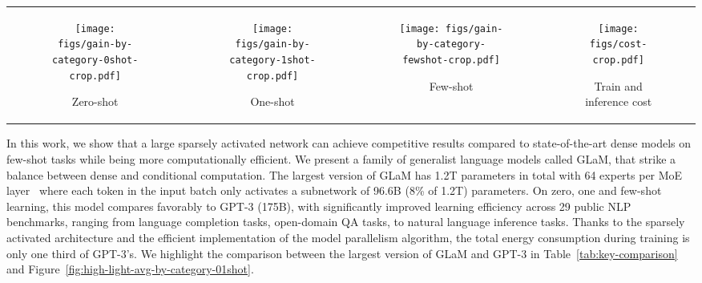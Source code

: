 \documentclass{article}
\newcommand{\glam}{GLaM\xspace}
\begin{document}
\begin{figure*}[tb]
\centering
\renewcommand\tabcolsep{1pt}
\begin{tabular}{cccc}
\begin{subfigure}[b]{0.25\textwidth}
\texttt{[image: figs/gain-by-category-0shot-crop.pdf]}
\caption{Zero-shot}
\end{subfigure}
&
\begin{subfigure}[b]{0.25\textwidth}
\texttt{[image: figs/gain-by-category-1shot-crop.pdf]}
\caption{One-shot}
\end{subfigure}
&
\begin{subfigure}[b]{0.25\textwidth}
\texttt{[image: figs/gain-by-category-fewshot-crop.pdf]}
\caption{Few-shot}
\end{subfigure}
&
\begin{subfigure}[b]{0.25\textwidth}
\texttt{[image: figs/cost-crop.pdf]}
\caption{Train and inference cost}
\end{subfigure}
\end{tabular}
\caption{An overview of the percentage change in predictive performance (higher is better) of \glam (64B/64E) versus GPT-3 (175B) in the (a) zero-shot, (b) one-shot, and (c) few-shot setting across 7 benchmark categories with 29 public tasks in total. Each bar in panel (a), (b) and (c) represents one benchmark category. Panel (d) compares the FLOPs needed per token prediction and training energy consumption.}
\label{fig:high-light-avg-by-category-01shot}
\end{figure*}

In this work, we show that a large sparsely activated network can achieve competitive results compared to state-of-the-art dense models on few-shot tasks while being more computationally efficient. We present a family of generalist language models called GLaM, that strike a balance between dense and conditional computation. The largest version of GLaM has 1.2T parameters in total with 64 experts per MoE layer~\cite{shazeer2017outrageously,lepikhin2020gshard,fedus2021switch} where each token in the input batch only activates a subnetwork of 96.6B (8\% of 1.2T) parameters. On zero, one and few-shot learning, this model compares favorably to  GPT-3 (175B), with significantly improved learning efficiency across 29 public NLP benchmarks, ranging from language completion tasks, open-domain QA tasks, to natural language inference tasks. Thanks to the sparsely activated architecture and the efficient implementation of the model parallelism algorithm, the total energy consumption during training is only one third of GPT-3's. We highlight the comparison between the largest version of \glam and GPT-3 in Table~\ref{tab:key-comparison} and Figure~\ref{fig:high-light-avg-by-category-01shot}. 
\end{document}

